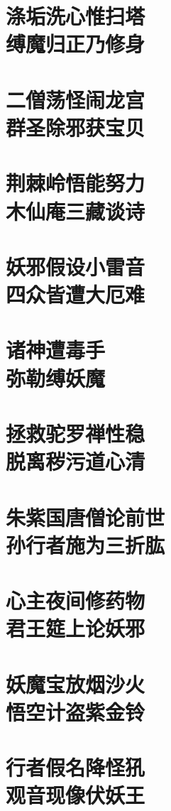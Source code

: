\documentclass[12pt,UTF8]{ctexbook}
\begin{document}
{\chapter[涤垢洗心惟扫塔\ 缚魔归正乃修身]{涤垢洗心惟扫塔\\缚魔归正乃修身}
\chapter[二僧荡怪闹龙宫\ 群圣除邪获宝贝]{二僧荡怪闹龙宫\\群圣除邪获宝贝}
\chapter[荆棘岭悟能努力\ 木仙庵三藏谈诗]{荆棘岭悟能努力\\木仙庵三藏谈诗}
\chapter[妖邪假设小雷音\ 四众皆遭大厄难]{妖邪假设小雷音\\四众皆遭大厄难}
\chapter[诸神遭毒手\ 弥勒缚妖魔]{诸神遭毒手\\弥勒缚妖魔}
\chapter[拯救驼罗禅性稳\ 脱离秽污道心清]{拯救驼罗禅性稳\\脱离秽污道心清}
\chapter[朱紫国唐僧论前世\ 孙行者施为三折肱]{朱紫国唐僧论前世\\孙行者施为三折肱}
\chapter[心主夜间修药物\ 君王筵上论妖邪]{心主夜间修药物\\君王筵上论妖邪}
\chapter[妖魔宝放烟沙火\ 悟空计盗紫金铃]{妖魔宝放烟沙火\\悟空计盗紫金铃}
\chapter[行者假名降怪犼\ 观音现像伏妖王]{行者假名降怪犼\\观音现像伏妖王}
}
\end{document}
